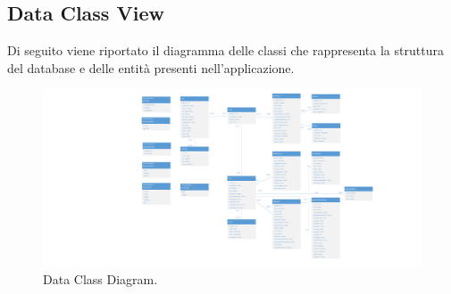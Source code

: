 \begin{landscape}
\section{Data Class View}
Di seguito viene riportato il diagramma delle classi che rappresenta la struttura del database e delle entità presenti nell'applicazione.

\begin{figure}[h!]
	\centering
	\includegraphics[width=0.8\linewidth]{./Iterazione 1/OtherFiles/UML - Data Class View}
	\caption{Data Class Diagram.}
	\label{fig:DataClassDiagram}
\end{figure}
\end{landscape}